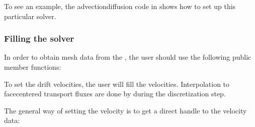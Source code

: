 \documentclass[letterpaper,10pt,english]{sphinxmanual}
\begin{document}
To see an example, the advection\sphinxhyphen{}diffusion code in  shows how to set up this particular solver.


\subsubsection{Filling the solver}
\label{\detokenize{Solvers/CDR:filling-the-solver}}
In order to obtain mesh data from the , the user should use the following public member functions:

\begin{sphinxVerbatim}[commandchars=\\\{\},formatcom=\scriptsize]
                                
                             
               
   
                               
                           
\end{sphinxVerbatim}

To set the drift velocities, the user will fill the  velocities.
Interpolation to face\sphinxhyphen{}centered transport fluxes are done by  during the discretization step.

The general way of setting the velocity is to get a direct handle to the velocity data:

\begin{sphinxVerbatim}[commandchars=\\\{\},formatcom=\scriptsize]
 

   
\end{sphinxVerbatim}
\end{document}
